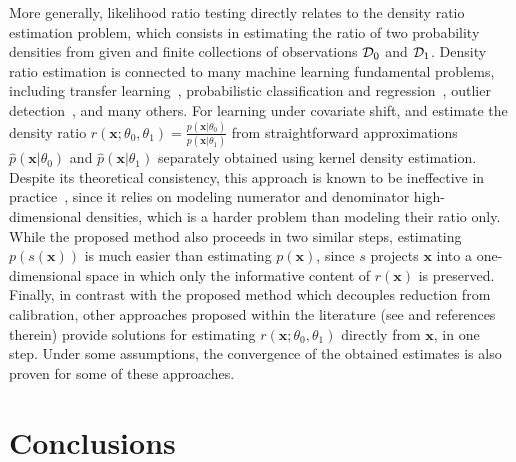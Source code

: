 \documentclass[12pt]{article}
\numberwithin{equation}{section}
\theoremstyle{plain}
\begin{document}
More generally, likelihood ratio testing directly relates to the density ratio
estimation problem, which consists in estimating the ratio of two probability
densities from given and finite collections of observations ${\cal D}_0$ and
${\cal D}_1$. Density ratio estimation is connected to many machine learning
fundamental problems, including transfer learning~\citep{sugiyama2012machine},
probabilistic classification and regression~\citep{vapnik1998statistical},
outlier detection~\citep{hido2011statistical}, and many others. For learning
under covariate shift, \cite{shimodaira2000improving} and \cite{sugiyama2005input} estimate
the density ratio $r(\mathbf{x};\theta_0,\theta_1) =
\frac{p(\mathbf{x}|\theta_0)}{p(\mathbf{x}|\theta_1)}$ from straightforward
approximations $\hat{p}(\mathbf{x}|\theta_0)$ and $\hat{p}(\mathbf{x}|\theta_1)$
separately obtained using kernel density estimation. Despite its theoretical
consistency, this approach is known to be ineffective in
practice~\citep{sugiyama2007covariate,bickel2009discriminative}, since
it relies on modeling numerator and denominator high-dimensional densities,
which is a harder problem than modeling their ratio only.
While the proposed method also proceeds in two similar steps, estimating
$p(s(\mathbf{x}))$ is much easier than estimating $p(\mathbf{x})$,
since $s$ projects $\mathbf{x}$ into a one-dimensional space in which only
the informative content of $r(\mathbf{x})$ is preserved.
Finally, in contrast with the
proposed method which decouples reduction from calibration, other
approaches proposed within the literature (see
\cite{sugiyama2012density,gretton2009covariate,nguyen2010estimating,vapnik2013constructive}
and references therein) provide solutions for estimating
$r(\mathbf{x};\theta_0,\theta_1)$ directly from $\mathbf{x}$, in one step. Under some
assumptions, the convergence of the obtained estimates is also proven for some
of these approaches.



\section{Conclusions}
\label{sec:conclusions}
\end{document}
